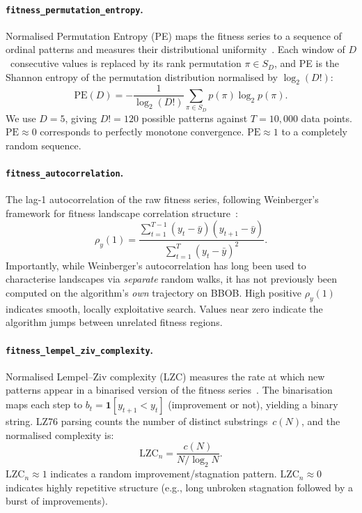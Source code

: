 \paragraph{\texttt{fitness\_permutation\_entropy}.}
Normalised Permutation Entropy (PE) maps the fitness series to a sequence of
ordinal patterns and measures their distributional uniformity~\cite{bandt2002permutation}.
Each window of $D$~consecutive values is replaced by its rank permutation
$\pi \in S_D$, and PE is the Shannon entropy of the permutation distribution
normalised by $\log_2(D!)$:
\begin{equation}
\label{eq:pe}
  \mathrm{PE}(D)
    = -\frac{1}{\log_2(D!)}\sum_{\pi \in S_D} p(\pi) \log_2 p(\pi).
\end{equation}
We use $D = 5$, giving $D! = 120$ possible patterns against $T = 10{,}000$
data points.  $\mathrm{PE} \approx 0$ corresponds to perfectly monotone
convergence. $\mathrm{PE} \approx 1$ to a completely random sequence.

\paragraph{\texttt{fitness\_autocorrelation}.}
The lag-1 autocorrelation of the raw fitness series, following Weinberger's
framework for fitness landscape correlation structure~\cite{weinberger1990fitness}:
\begin{equation}
\label{eq:fitac}
  \rho_y(1)
    = \frac{\sum_{t=1}^{T-1}(y_t - \bar{y})(y_{t+1} - \bar{y})}
           {\sum_{t=1}^{T}(y_t - \bar{y})^2}.
\end{equation}
Importantly, while Weinberger's autocorrelation has long been used to
characterise landscapes via \emph{separate} random walks, it has not previously
been computed on the algorithm's \emph{own} trajectory on BBOB.  High positive
$\rho_y(1)$ indicates smooth, locally exploitative search. Values near zero
indicate the algorithm jumps between unrelated fitness regions.

\paragraph{\texttt{fitness\_lempel\_ziv\_complexity}.}
Normalised Lempel--Ziv complexity (LZC) measures the rate at which new
patterns appear in a binarised version of the fitness
series~\cite{lempel1976complexity}.  The binarisation maps each step to
$b_t = \mathbf{1}[y_{t+1} < y_t]$ (improvement or not), yielding a binary
string.  LZ76 parsing counts the number of distinct substrings~$c(N)$, and the
normalised complexity is:
\begin{equation}
\label{eq:lzc}
  \mathrm{LZC}_n = \frac{c(N)}{N / \log_2 N}.
\end{equation}
$\mathrm{LZC}_n \approx 1$ indicates a random improvement/stagnation pattern.
$\mathrm{LZC}_n \approx 0$ indicates highly repetitive structure (e.g.,
long unbroken stagnation followed by a burst of improvements).

